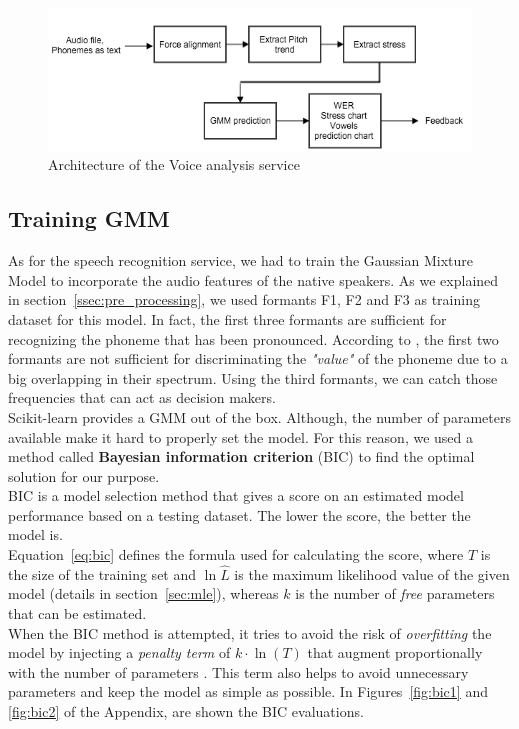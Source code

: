 \begin{figure}[!ht]
	\centering
	\includegraphics[scale=0.6]{Figures/gmm_service.png}
	\caption{Architecture of the Voice analysis service}
	\label{fig:gmm_service}
\end{figure}

\subsection{Training GMM}
\noindent As for the speech recognition service, we had to train the Gaussian Mixture Model to incorporate the audio features of the native speakers. As we explained in section~\ref{ssec:pre_processing}, we used formants F1, F2 and F3 as training dataset for this model. In fact, the first three formants are sufficient for recognizing the phoneme that has been pronounced. According to \cite{prica2010recognition}, the first two formants are not sufficient for discriminating the \textit{"value"} of the phoneme due to a big overlapping in their spectrum. Using the third formants, we can catch those frequencies that can act as decision makers. \\

\noindent Scikit-learn provides a GMM out of the box. Although, the number of parameters available make it hard to properly set the model. For this reason, we used a method called \textbf{Bayesian information criterion} (BIC) to find the optimal solution for our purpose. \\

\noindent BIC is a model selection method that gives a score on an estimated model performance based on a testing dataset. The lower the score, the better the model is. \\
\noindent Equation~\ref{eq:bic} defines the formula used for calculating the score, where $T$ is the size of the training set and $\ln{\hat L}$ is the maximum likelihood value of the given model (details in section~\ref{sec:mle}), whereas $k$ is the number of \textit{free} parameters that can be estimated. \\
\noindent When the BIC method is attempted, it tries to avoid the risk of \textit{overfitting} the model by injecting a \textit{penalty term} of $k \cdot \ln(T)$ that augment proportionally with the number of parameters \cite{bic_info}. This term also helps to avoid unnecessary parameters and keep the model as simple as possible. In Figures~\ref{fig:bic1} and \ref{fig:bic2} of the Appendix, are shown the BIC evaluations.

